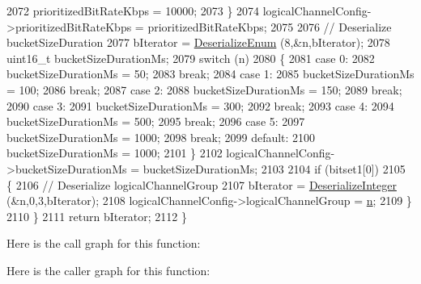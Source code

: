 \begin{DoxyCode}
2072           prioritizedBitRateKbps = 10000;
2073         \}
2074       logicalChannelConfig->prioritizedBitRateKbps = prioritizedBitRateKbps;
2075 
2076       \textcolor{comment}{// Deserialize bucketSizeDuration}
2077       bIterator = \hyperlink{classns3_1_1Asn1Header_a4fcc253e0eec3483c775b005c1875f2d}{DeserializeEnum} (8,&n,bIterator);
2078       uint16\_t bucketSizeDurationMs;
2079       \textcolor{keywordflow}{switch} (n)
2080         \{
2081         \textcolor{keywordflow}{case} 0:
2082           bucketSizeDurationMs = 50;
2083           \textcolor{keywordflow}{break};
2084         \textcolor{keywordflow}{case} 1:
2085           bucketSizeDurationMs = 100;
2086           \textcolor{keywordflow}{break};
2087         \textcolor{keywordflow}{case} 2:
2088           bucketSizeDurationMs = 150;
2089           \textcolor{keywordflow}{break};
2090         \textcolor{keywordflow}{case} 3:
2091           bucketSizeDurationMs = 300;
2092           \textcolor{keywordflow}{break};
2093         \textcolor{keywordflow}{case} 4:
2094           bucketSizeDurationMs = 500;
2095           \textcolor{keywordflow}{break};
2096         \textcolor{keywordflow}{case} 5:
2097           bucketSizeDurationMs = 1000;
2098           \textcolor{keywordflow}{break};
2099         \textcolor{keywordflow}{default}:
2100           bucketSizeDurationMs = 1000;
2101         \}
2102       logicalChannelConfig->bucketSizeDurationMs = bucketSizeDurationMs;
2103 
2104       \textcolor{keywordflow}{if} (bitset1[0])
2105         \{
2106           \textcolor{comment}{// Deserialize logicalChannelGroup}
2107           bIterator = \hyperlink{classns3_1_1Asn1Header_a49802c9af30018b078150e866b6ecae2}{DeserializeInteger} (&n,0,3,bIterator);
2108           logicalChannelConfig->logicalChannelGroup = \hyperlink{namespacesample-rng-plot_aeb5ee5c431e338ef39b7ac5431242e1d}{n};
2109         \}
2110     \}
2111   \textcolor{keywordflow}{return} bIterator;
2112 \}
\end{DoxyCode}


Here is the call graph for this function\+:




Here is the caller graph for this function\+:



